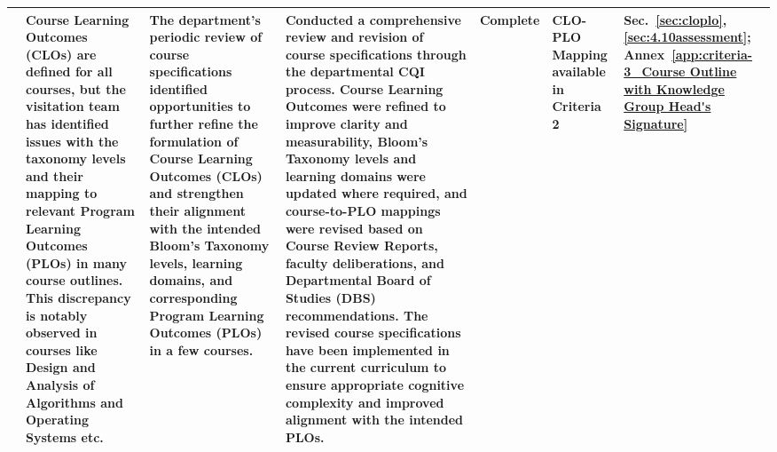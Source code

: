 \begin{landscape}
\begin{longtable}{|P{2.3cm}|P{5.0cm}|P{4.5cm}|P{5.0cm}|P{2.4cm}|P{2.8cm}|P{1.8cm}|}
 & Course Learning Outcomes (CLOs) are defined for all courses, but the visitation team has identified issues with the taxonomy levels and their mapping to relevant Program Learning Outcomes (PLOs) in many course outlines. This discrepancy is notably observed in courses like Design and Analysis of Algorithms and Operating Systems etc. & The department's periodic review of course specifications identified opportunities to further refine the formulation of Course Learning Outcomes (CLOs) and strengthen their alignment with the intended Bloom's Taxonomy levels, learning domains, and corresponding Program Learning Outcomes (PLOs) in a few courses. & Conducted a comprehensive review and revision of course specifications through the departmental CQI process. Course Learning Outcomes were refined to improve clarity and measurability, Bloom's Taxonomy levels and learning domains were updated where required, and course-to-PLO mappings were revised based on Course Review Reports, faculty deliberations, and Departmental Board of Studies (DBS) recommendations. The revised course specifications have been implemented in the current curriculum to ensure appropriate cognitive complexity and improved alignment with the intended PLOs. & Complete & CLO-PLO Mapping available in Criteria 2 & Sec.~\ref{sec:cloplo}, \ref{sec:4.10assessment}; Annex~\ref{app:criteria-3_Course Outline with Knowledge Group Head's Signature} \\ \hline

\end{longtable}
\end{landscape}
